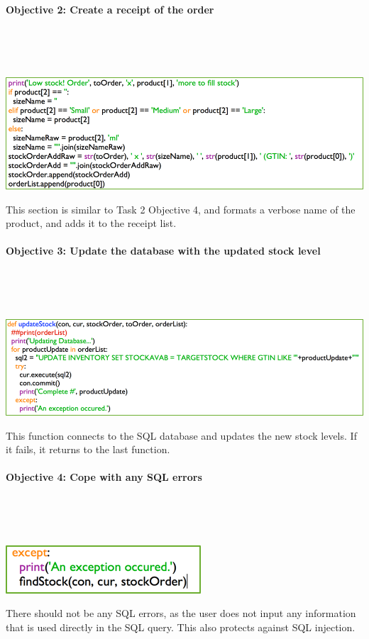\documentclass[a4paper]{article}
\begin{document}
\paragraph{Objective 2: Create a receipt of the order} ~\par ~\par
\noindent\includegraphics{task3_obj2_1.png} \par 
This section is similar to Task 2 Objective 4, and formats a verbose name of the product, and adds it to the receipt list.
\paragraph{Objective 3: Update the database with the updated stock level} ~\par ~\par
\noindent\includegraphics{task3_obj3_1.png} \par 
This function connects to the SQL database and updates the new stock levels. If it fails, it returns to the last function. 
\paragraph{Objective 4: Cope with any SQL errors} ~\par ~\par
\noindent\includegraphics{task3_obj4_1.png} \par 
There should not be any SQL errors, as the user does not input any information that is used directly in the SQL query. This also protects against SQL injection.
\end{document}
